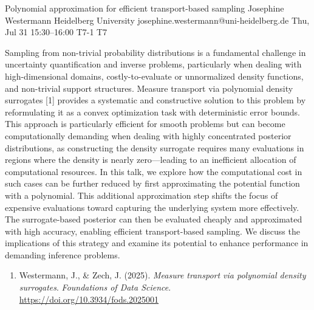 \begin{talk}
  {Polynomial approximation for efficient transport-based sampling}%
  {Josephine Westermann}%
  {Heidelberg University}%
  {josephine.westermann@uni-heidelberg.de}%
  {}%
  {}%
  {Thu, Jul 31 15:30--16:00}%
  {T7-1}%
  {T7}%
  {}%
  {}

Sampling from non-trivial probability distributions is a fundamental challenge in uncertainty quantification and inverse problems, particularly when dealing with high-dimensional domains, costly-to-evaluate or unnormalized density functions, and non-trivial support structures. Measure transport via polynomial density surrogates [1] provides a systematic and constructive solution to this problem by reformulating it as a convex optimization task with deterministic error bounds. This approach is particularly efficient for smooth problems but can become computationally demanding when dealing with highly concentrated posterior distributions, as constructing the density surrogate requires many evaluations in regions where the density is nearly zero—leading to an inefficient allocation of computational resources. In this talk, we explore how the computational cost in such cases can be further reduced by first approximating the potential function with a polynomial. This additional approximation step shifts the focus of expensive evaluations toward capturing the underlying system more effectively. The surrogate-based posterior can then be evaluated cheaply and approximated with high accuracy, enabling efficient transport-based sampling. We discuss the implications of this strategy and examine its potential to enhance performance in demanding inference problems.

\medskip

\begin{enumerate}
 \item[{[1]}] Westermann, J., \& Zech, J. (2025). \textit{Measure transport via polynomial density surrogates}. \textit{Foundations of Data Science}. \url{https://doi.org/10.3934/fods.2025001}
\end{enumerate}

\end{talk}

